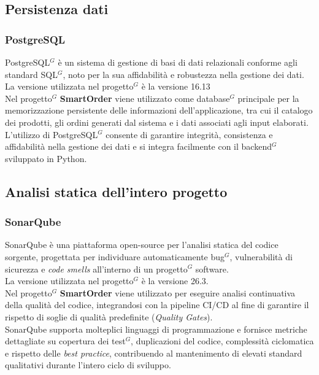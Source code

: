 \subsection{Persistenza dati}

\subsubsection{PostgreSQL}

PostgreSQL$^G$ è un sistema di gestione di basi di dati relazionali conforme agli standard SQL$^G$, noto per la sua affidabilità e robustezza nella gestione dei dati.\\
La versione utilizzata nel progetto$^G$ è la versione 16.13 \\
Nel progetto$^G$ \textbf{SmartOrder} viene utilizzato come database$^G$ principale per la memorizzazione persistente delle informazioni dell'applicazione, tra cui il catalogo dei prodotti, gli ordini generati dal sistema e i dati associati agli input elaborati. L'utilizzo di PostgreSQL$^G$ consente di garantire integrità, consistenza e affidabilità nella gestione dei dati e si integra facilmente con il backend$^G$ sviluppato in Python.

\subsection{Analisi statica dell'intero progetto}

\subsubsection{SonarQube}
SonarQube è una piattaforma open-source per l'analisi statica del codice sorgente, progettata per individuare automaticamente bug$^G$, vulnerabilità di sicurezza e \textit{code smells} all'interno di un progetto$^G$ software.\\
La versione utilizzata nel progetto$^G$ è la versione 26.3.\\
Nel progetto$^G$ \textbf{SmartOrder} viene utilizzato per eseguire analisi continuativa della qualità del codice, integrandosi con la pipeline CI/CD al fine di garantire il rispetto di soglie di qualità predefinite (\textit{Quality Gates}). \\
SonarQube supporta molteplici linguaggi di programmazione e fornisce metriche dettagliate su copertura dei test$^G$, duplicazioni del codice, complessità ciclomatica e rispetto delle \textit{best practice}, contribuendo al mantenimento di elevati standard qualitativi durante l'intero ciclo di sviluppo.